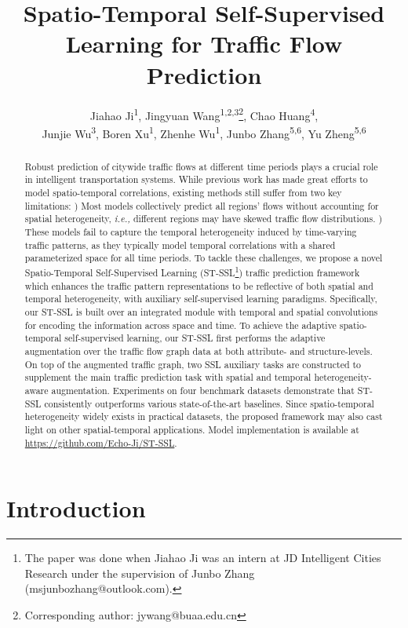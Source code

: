 \documentclass[letterpaper]{article} \usepackage{aaai23}  \usepackage{times}  \usepackage{helvet}  \usepackage{courier}  \usepackage[hyphens]{url}  \usepackage{graphicx} \urlstyle{rm} \def\UrlFont{\rm}  \usepackage{natbib}  \usepackage{caption} \frenchspacing  \setlength{\pdfpagewidth}{8.5in} \setlength{\pdfpageheight}{11in}
\title{Spatio-Temporal Self-Supervised Learning for Traffic Flow Prediction }
\author {
    Jiahao Ji\textsuperscript{\rm 1},
    Jingyuan Wang\textsuperscript{\rm 1,\rm 2,\rm 3}\thanks{Corresponding author: jywang@buaa.edu.cn},
    Chao Huang\textsuperscript{\rm 4},\\
    Junjie Wu\textsuperscript{\rm 3},
    Boren Xu\textsuperscript{\rm 1},
    Zhenhe Wu\textsuperscript{\rm 1},
    Junbo Zhang\textsuperscript{\rm 5,\rm 6},
    Yu Zheng\textsuperscript{\rm 5,\rm 6}
}
\newcommand{\ie}{\emph{i.e.,}\xspace}
\newcommand{\name}{ST-SSL\xspace}
\begin{document}
\maketitle

\begin{abstract}
    Robust prediction of citywide traffic flows at different time periods plays a crucial role in intelligent transportation systems. While previous work has made great efforts to model spatio-temporal correlations, existing methods still suffer from two key limitations: ) Most models collectively predict all regions' flows without accounting for spatial heterogeneity, \ie different regions may have skewed traffic flow distributions. ) These models fail to capture the temporal heterogeneity induced by time-varying traffic patterns, as they typically model temporal correlations with a shared parameterized space for all time periods. To tackle these challenges, we propose a novel Spatio-Temporal Self-Supervised Learning (\name\footnote{The paper was done when Jiahao Ji was an intern at JD Intelligent Cities Research under the supervision of Junbo Zhang (msjunbozhang@outlook.com).}) traffic prediction framework which enhances the traffic pattern representations to be reflective of both spatial and temporal heterogeneity, with auxiliary self-supervised learning paradigms. Specifically, our \name is built over an integrated module with temporal and spatial convolutions for encoding the information across space and time. To achieve the adaptive spatio-temporal self-supervised learning, our \name first performs the adaptive augmentation over the traffic flow graph data at both attribute- and structure-levels. On top of the augmented traffic graph, two SSL auxiliary tasks are constructed to supplement the main traffic prediction task with spatial and temporal heterogeneity-aware augmentation. Experiments on four benchmark datasets demonstrate that \name consistently outperforms various state-of-the-art baselines. Since spatio-temporal heterogeneity widely exists in practical datasets, the proposed framework may also cast light on other spatial-temporal applications. Model implementation is available at \url{https://github.com/Echo-Ji/ST-SSL}.


\end{abstract}


\section{Introduction}\label{sec:intro}
\end{document}
